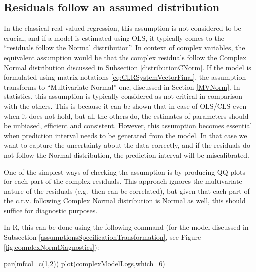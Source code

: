 \documentclass[
]{book}
\newenvironment{Shaded}{\begin{snugshade}}{\end{snugshade}}
\newcommand{\AttributeTok}[1]{\textcolor[rgb]{0.77,0.63,0.00}{#1}}
\newcommand{\DecValTok}[1]{\textcolor[rgb]{0.00,0.00,0.81}{#1}}
\newcommand{\FunctionTok}[1]{\textcolor[rgb]{0.00,0.00,0.00}{#1}}
\newcommand{\NormalTok}[1]{#1}
\begin{document}
\hypertarget{residuals-follow-an-assumed-distribution}{%
\subsection{Residuals follow an assumed distribution}\label{residuals-follow-an-assumed-distribution}}

In the classical real-valued regression, this assumption is not considered to be crucial, and if a model is estimated using OLS, it typically comes to the ``residuals follow the Normal distribution''. In context of complex variables, the equivalent assumption would be that the complex residuals follow the Complex Normal distribution discussed in Subsection \ref{distributionCNorm}. If the model is formulated using matrix notations \eqref{eq:CLRSystemVectorFinal}, the assumption transforms to ``Multivariate Normal'' one, discussed in Section \ref{MVNorm}. In statistics, this assumption is typically considered as not critical in comparison with the others. This is because it can be shown that in case of OLS/CLS even when it does not hold, but all the others do, the estimates of parameters should be unbiased, efficient and consistent. However, this assumption becomes essential when prediction interval needs to be generated from the model. In that case we want to capture the uncertainty about the data correctly, and if the residuals do not follow the Normal distribution, the prediction interval will be miscalibrated.

One of the simplest ways of checking the assumption is by producing QQ-plots for each part of the complex residuals. This approach ignores the multivariate nature of the residuals (e.g.~then can be correlated), but given that each part of the c.r.v. following Complex Normal distribution is Normal as well, this should suffice for diagnostic purposes.

In R, this can be done using the following command (for the model discussed in Subsection \ref{assumptionsSpecificationTransformation}, see Figure \ref{fig:complexNormDiagnostics}):

\begin{Shaded}
\begin{Highlighting}[]
\FunctionTok{par}\NormalTok{(}\AttributeTok{mfcol=}\FunctionTok{c}\NormalTok{(}\DecValTok{1}\NormalTok{,}\DecValTok{2}\NormalTok{))}
\FunctionTok{plot}\NormalTok{(complexModelLogs,}\AttributeTok{which=}\DecValTok{6}\NormalTok{)}
\end{Highlighting}
\end{Shaded}
\end{document}
